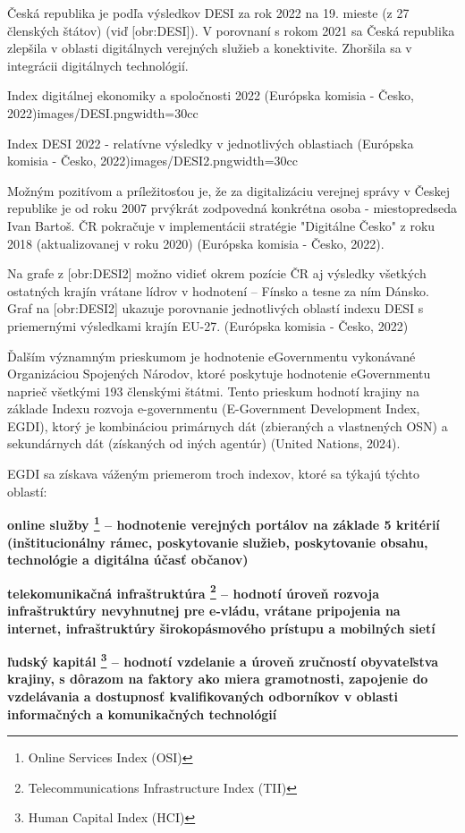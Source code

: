 Česká republika je podľa výsledkov DESI za rok 2022 na 19. mieste (z 27 členských štátov) (viď [obr:DESI]). V porovnaní s rokom 2021 sa Česká republika zlepšila v oblasti digitálnych verejných služieb a konektivite. Zhoršila sa v integrácii digitálnych technológií.

{Index digitálnej ekonomiky a spoločnosti 2022 (Európska komisia - Česko, 2022)}{images/DESI.png}{width=30cc}

{Index DESI 2022 - relatívne výsledky v jednotlivých oblastiach (Európska komisia - Česko, 2022)}{images/DESI2.png}{width=30cc}

Možným pozitívom a príležitosťou je, že za digitalizáciu verejnej správy v Českej republike je od roku 2007 prvýkrát zodpovedná konkrétna osoba - miestopredseda Ivan Bartoš. ČR pokračuje v implementácii stratégie "Digitálne Česko" z roku 2018 (aktualizovanej v roku 2020) \scr(Európska komisia - Česko, 2022).

Na grafe z [obr:DESI2] možno vidieť okrem pozície ČR aj výsledky všetkých ostatných krajín vrátane lídrov v hodnotení -- Fínsko a tesne za ním Dánsko. Graf na [obr:DESI2] ukazuje porovnanie jednotlivých oblastí indexu DESI s priemernými výsledkami krajín EU-27. \scr(Európska komisia - Česko, 2022)

Ďalším významným prieskumom je hodnotenie eGovernmentu vykonávané Organizáciou Spojených Národov, ktoré poskytuje hodnotenie eGovernmentu  naprieč všetkými 193 členskými štátmi. Tento prieskum hodnotí krajiny na základe Indexu rozvoja e-governmentu (E-Government Development Index, EGDI), ktorý je kombináciou primárnych dát (zbieraných a vlastnených OSN) a sekundárnych dát (získaných od iných agentúr) \scr(United Nations, 2024).

EGDI sa získava váženým priemerom troch indexov, ktoré sa týkajú týchto oblastí:

\startitemize
\item{\start\bf online služby \stop \footnote{Online Services Index (OSI)} -- hodnotenie verejných portálov na základe 5 kritérií (inštitucionálny rámec, poskytovanie služieb, poskytovanie obsahu, technológie a digitálna účasť občanov)}
\item{\start\bf telekomunikačná infraštruktúra  \stop \footnote{Telecommunications Infrastructure Index (TII)} -- hodnotí úroveň rozvoja infraštruktúry nevyhnutnej pre e-vládu, vrátane pripojenia na internet, infraštruktúry širokopásmového prístupu a mobilných sietí}
\item{\start\bf ľudský kapitál \stop \footnote{Human Capital Index (HCI)} -- hodnotí vzdelanie a úroveň zručností obyvateľstva krajiny, s dôrazom na faktory ako miera gramotnosti, zapojenie do vzdelávania a dostupnosť kvalifikovaných odborníkov v oblasti informačných a komunikačných technológií}
\stopitemize 

